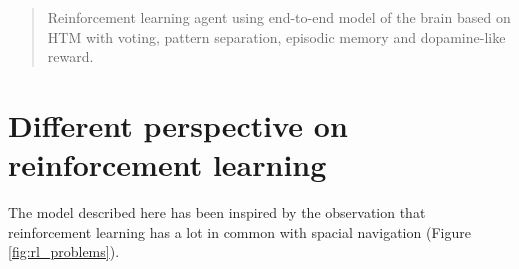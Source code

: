 \documentclass[12pt]{article}
\begin{document}
\maketitle
\lstset{
	basicstyle=\ttfamily,
	mathescape
}


\begin{abstract}
	Reinforcement learning agent using end-to-end model of the brain based on HTM with voting, pattern separation,
	episodic memory and dopamine-like reward.
\end{abstract}

\tableofcontents

\section{Different perspective on reinforcement learning}

The model described here has been inspired by the observation that
reinforcement learning has a lot in common with spacial navigation (Figure \ref{fig:rl_problems}). 
\end{document}

